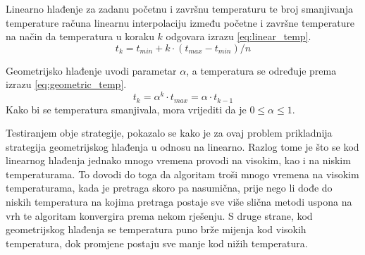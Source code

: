 Linearno hlađenje za zadanu početnu i završnu temperaturu te broj smanjivanja temperature računa linearnu interpolaciju između početne i završne temperature na način da temperatura u koraku $k$ odgovara izrazu \eqref{eq:linear_temp}.
\begin{equation}
\label{eq:linear_temp}
    t_k = t_{min} + k \cdot \left( t_{max} - t_{min} \right) / n
\end{equation}

Geometrijsko hlađenje uvodi parametar $\alpha$, a temperatura se određuje prema izrazu \eqref{eq:geometric_temp}.
\begin{equation}
\label{eq:geometric_temp}
    t_k = \alpha^k \cdot t_{max} = \alpha \cdot t_{k-1}
\end{equation}
Kako bi se temperatura smanjivala, mora vrijediti da je $0 \le \alpha \le 1$.

Testiranjem obje strategije, pokazalo se kako je za ovaj problem prikladnija strategija geometrijskog hlađenja u odnosu na linearno.
Razlog tome je što se kod linearnog hlađenja jednako mnogo vremena provodi na visokim, kao i na niskim temperaturama.
To dovodi do toga da algoritam troši mnogo vremena na visokim temperaturama, kada je pretraga skoro pa nasumična, prije nego li dođe do niskih temperatura na kojima pretraga postaje sve više slična metodi uspona na vrh te algoritam konvergira prema nekom rješenju.
S druge strane, kod geometrijskog hlađenja se temperatura puno brže mijenja kod visokih temperatura, dok promjene postaju sve manje kod nižih temperatura.
    
